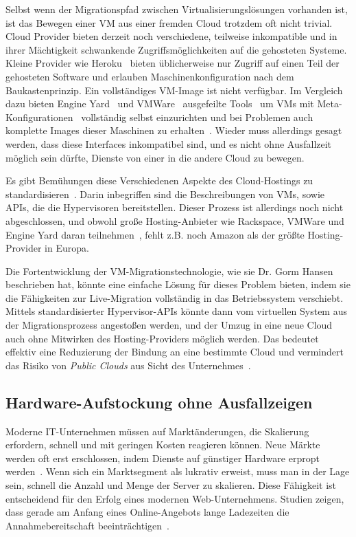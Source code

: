 Selbst wenn der Migrationspfad zwischen Virtualisierungslösungen
vorhanden ist, ist das Bewegen einer VM aus einer fremden Cloud
trotzdem oft nicht trivial. Cloud Provider bieten derzeit noch
verschiedene, teilweise inkompatible und in ihrer Mächtigkeit
schwankende Zugriffsmöglichkeiten auf die gehosteten Systeme. Kleine
Provider wie Heroku~\cite{none} bieten üblicherweise nur Zugriff auf
einen Teil der gehosteten Software und erlauben Maschinenkonfiguration
nach dem Baukastenprinzip. Ein vollständiges VM-Image ist nicht
verfügbar. Im Vergleich dazu bieten Engine Yard~\cite{none} und
VMWare~\cite{none} ausgefeilte Tools~\cite{none} um VMs mit
Meta-Konfigurationen~\cite{chef} vollständig selbst einzurichten und
bei Problemen auch komplette Images dieser Maschinen zu
erhalten~\cite{none}. Wieder muss allerdings gesagt werden, dass diese
Interfaces inkompatibel sind, und es nicht ohne Ausfallzeit möglich
sein dürfte, Dienste von einer in die andere Cloud zu bewegen.

Es gibt Bemühungen diese Verschiedenen Aspekte des Cloud-Hostings zu
standardisieren~\cite{cloudstandard}. Darin inbegriffen sind die
Beschreibungen von VMs, sowie APIs, die die Hypervisoren
bereitstellen. Dieser Prozess ist allerdings noch nicht abgeschlossen,
und obwohl große Hosting-Anbieter wie Rackspace, VMWare und Engine
Yard daran teilnehmen~\cite{none}, fehlt z.B. noch Amazon als der
größte Hosting-Provider in Europa.

Die Fortentwicklung der VM-Migrationstechnologie, wie sie
Dr. Gorm Hansen beschrieben hat, könnte eine einfache Lösung für
dieses Problem bieten, indem sie die Fähigkeiten zur Live-Migration
vollständig in das Betriebssystem verschiebt. Mittels
standardisierter Hypervisor-APIs könnte dann vom virtuellen System
aus der Migrationsprozess angestoßen werden, und der Umzug in eine
neue Cloud auch ohne Mitwirken des Hosting-Providers möglich
werden. Das bedeutet effektiv eine Reduzierung der Bindung an eine
bestimmte Cloud und vermindert das Risiko von \emph{Public Clouds} aus
Sicht des Unternehmes~\cite{none}.

\subsection{Hardware-Aufstockung ohne Ausfallzeigen}
Moderne IT-Unternehmen müssen auf Marktänderungen, die Skalierung
erfordern, schnell und mit geringen Kosten reagieren können. Neue
Märkte werden oft erst erschlossen, indem Dienste auf günstiger
Hardware erpropt werden~\cite{tanenbaum1992modern}. Wenn sich ein
Marktsegment als lukrativ erweist, muss man in der Lage sein, schnell
die Anzahl und Menge der Server zu skalieren. Diese Fähigkeit ist
entscheidend für den Erfolg eines modernen Web-Unternehmens. Studien
zeigen, dass gerade am Anfang eines Online-Angebots lange Ladezeiten
die Annahmebereitschaft beeinträchtigen~\cite{kohavi2007online}.

